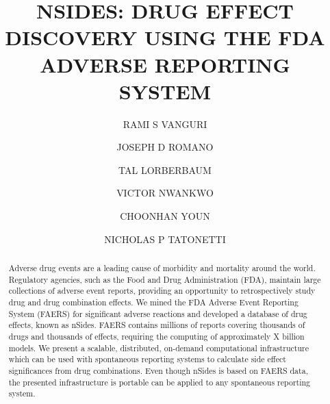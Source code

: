 \documentclass{ws-procs11x85}
\begin{document}
\title{NSIDES: DRUG EFFECT DISCOVERY USING THE FDA ADVERSE REPORTING SYSTEM}

\author{RAMI S VANGURI}

\address{Department of Biomedical Informatics, Columbia University,\\
New York, NY 10032 USA\\
E-mail: r.vanguri@columbia.edu}

\author{JOSEPH D ROMANO}

\address{Department of Biomedical Informatics, Columbia University,\\
New York, NY 10032 USA\\
E-mail: jdr2160@columbia.edu}

\author{TAL LORBERBAUM}

\address{Department of Biomedical Informatics, Columbia University,\\
New York, NY 10032 USA\\
E-mail: tal.lorberbaum@columbia.edu}

\author{VICTOR NWANKWO}

\address{Department of Biomedical Informatics, Columbia University,\\
New York, NY 10032 USA\\
E-mail: vtn2106@columbia.edu}

\author{CHOONHAN YOUN}

\address{San Diego Supercomputer Center, University of California, San Diego,\\
La Jolla, CA 92093 USA\\
E-mail: cyoun@sdsc.edu}

\author{NICHOLAS P TATONETTI}

\address{Department of Biomedical Informatics, Columbia University,\\
New York, NY 10032 USA\\
E-mail: nick.tatonetti@columbia.edu}

\begin{abstract}
Adverse drug events are a leading cause of morbidity and mortality
around the world. Regulatory agencies, such as the Food and Drug
Administration (FDA), maintain large collections of adverse event
reports, providing an opportunity to retrospectively study drug and
drug combination effects.  We mined the FDA Adverse Event Reporting
System (FAERS) for significant adverse reactions and developed a
database of drug effects, known as nSides. FAERS contains millions of
reports covering thousands of drugs and thousands of effects,
requiring the computing of approximately X billion models. We present
a scalable, distributed, on-demand computational infrastructure which
can be used with spontaneous reporting systems to calculate side
effect significances from drug combinations. Even though nSides is
based on FAERS data, the presented infrastructure is portable can be
applied to any spontaneous reporting system.
\end{abstract}
\end{document}
